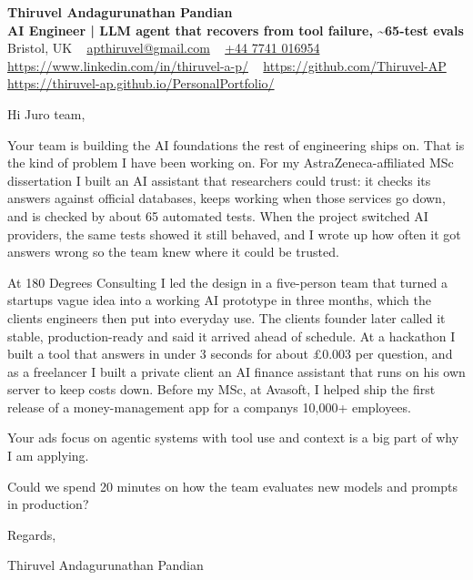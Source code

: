 \documentclass[11pt,a4paper]{article}
\begin{document}
\raggedright
\pagestyle{empty}

\begin{center}
    {\LARGE \color{linkblue} \textbf{Thiruvel Andagurunathan Pandian}}\\[0.2cm]
    {\color{headernavy}\small\textbf{AI Engineer | LLM agent that recovers from tool failure, \textasciitilde{}65-test evals}}\\[0.2cm]
    {\small Bristol, UK\nobreak\ \,\textbar\, \href{mailto:apthiruvel@gmail.com}{apthiruvel@gmail.com}\nobreak\ \,\textbar\, \href{tel:+447741016954}{+44 7741 016954}\nobreak\ \,\textbar\, \href{https://www.linkedin.com/in/thiruvel-a-p/}{https://www.linkedin.com/in/thiruvel-a-p/}\nobreak\ \,\textbar\, \href{https://github.com/Thiruvel-AP}{https://github.com/Thiruvel-AP}\nobreak\ \,\textbar\, \href{https://thiruvel-ap.github.io/PersonalPortfolio/}{https://thiruvel-ap.github.io/PersonalPortfolio/}}

\end{center}

\vspace{0.4cm}

\noindent
Hi Juro team,

Your team is building the AI foundations the rest of engineering ships on. That is the kind of problem I have been working on. For my AstraZeneca-affiliated MSc dissertation I built an AI assistant that researchers could trust: it checks its answers against official databases, keeps working when those services go down, and is checked by about 65 automated tests. When the project switched AI providers, the same tests showed it still behaved, and I wrote up how often it got answers wrong so the team knew where it could be trusted.

At 180 Degrees Consulting I led the design in a five-person team that turned a startup\textquotesingle{}s vague idea into a working AI prototype in three months, which the client\textquotesingle{}s engineers then put into everyday use. The client\textquotesingle{}s founder later called it \textquotedbl{}stable, production-ready\textquotedbl{} and said it arrived \textquotedbl{}ahead of schedule\textquotedbl{}. At a hackathon I built a tool that answers in under 3 seconds for about £0.003 per question, and as a freelancer I built a private client an AI finance assistant that runs on his own server to keep costs down. Before my MSc, at Avasoft, I helped ship the first release of a money-management app for a company\textquotesingle{}s 10,000+ employees.

Your ad\textquotesingle{}s focus on agentic systems with tool use and context is a big part of why I am applying.

Could we spend 20 minutes on how the team evaluates new models and prompts in production?

\vspace{0.5cm}

Regards,

Thiruvel Andagurunathan Pandian
\end{document}
